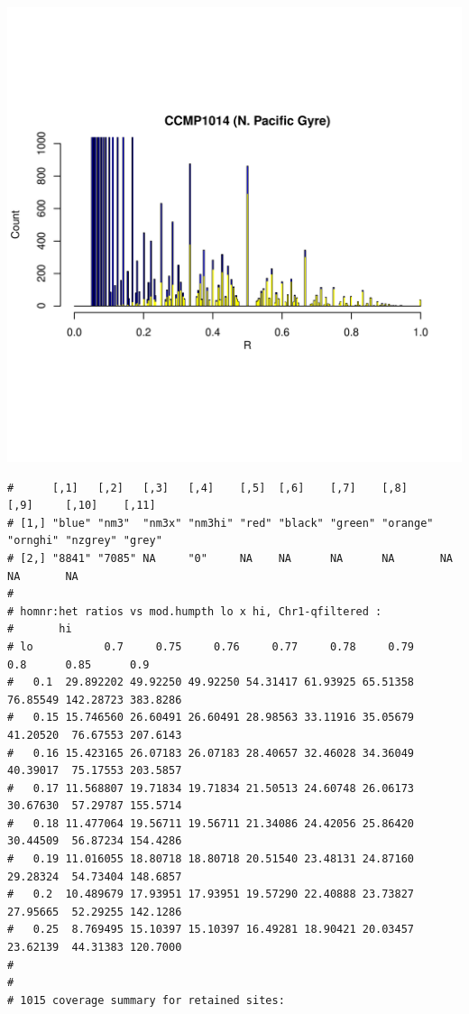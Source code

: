 \documentclass{article}\usepackage[]{graphicx}\usepackage[]{color}
\makeatletter
\def\maxwidth{ %
  \ifdim\Gin@nat@width>\linewidth
    \linewidth
  \else
    \Gin@nat@width
  \fi
}
\newenvironment{kframe}{%
 \def\at@end@of@kframe{}%
 \ifinner\ifhmode%
  \def\at@end@of@kframe{\end{minipage}}%
  \begin{minipage}{\columnwidth}%
 \fi\fi%
 \def\FrameCommand##1{\hskip\@totalleftmargin \hskip-\fboxsep
 \colorbox{shadecolor}{##1}\hskip-\fboxsep
     \hskip-\linewidth \hskip-\@totalleftmargin \hskip\columnwidth}%
 \MakeFramed {\advance\hsize-\width
   \@totalleftmargin\z@ \linewidth\hsize
   \@setminipage}}%
 {\par\unskip\endMakeFramed%
 \at@end@of@kframe}
\newenvironment{knitrout}{}{} %
\makeatother
\begin{document}
\begin{knitrout}
\includegraphics[width=\maxwidth]{FigS7-hwe-histo-figs-knitr/unnamed-chunk-10-49} 
\begin{kframe}\begin{verbatim}
#      [,1]   [,2]   [,3]   [,4]    [,5]  [,6]    [,7]    [,8]     [,9]     [,10]    [,11] 
# [1,] "blue" "nm3"  "nm3x" "nm3hi" "red" "black" "green" "orange" "ornghi" "nzgrey" "grey"
# [2,] "8841" "7085" NA     "0"     NA    NA      NA      NA       NA       NA       NA
# 
# homnr:het ratios vs mod.humpth lo x hi, Chr1-qfiltered :
#       hi
# lo           0.7     0.75     0.76     0.77     0.78     0.79      0.8      0.85      0.9
#   0.1  29.892202 49.92250 49.92250 54.31417 61.93925 65.51358 76.85549 142.28723 383.8286
#   0.15 15.746560 26.60491 26.60491 28.98563 33.11916 35.05679 41.20520  76.67553 207.6143
#   0.16 15.423165 26.07183 26.07183 28.40657 32.46028 34.36049 40.39017  75.17553 203.5857
#   0.17 11.568807 19.71834 19.71834 21.50513 24.60748 26.06173 30.67630  57.29787 155.5714
#   0.18 11.477064 19.56711 19.56711 21.34086 24.42056 25.86420 30.44509  56.87234 154.4286
#   0.19 11.016055 18.80718 18.80718 20.51540 23.48131 24.87160 29.28324  54.73404 148.6857
#   0.2  10.489679 17.93951 17.93951 19.57290 22.40888 23.73827 27.95665  52.29255 142.1286
#   0.25  8.769495 15.10397 15.10397 16.49281 18.90421 20.03457 23.62139  44.31383 120.7000
# 
# 
# 1015 coverage summary for retained sites:

\end{verbatim}
\end{kframe}
\end{knitrout}
\end{document}
